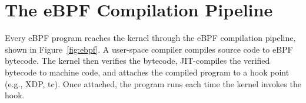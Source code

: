 






\section{The eBPF Compilation Pipeline}
\label{sec:background}

Every eBPF program reaches the kernel through the eBPF compilation pipeline, shown in Figure~\ref{fig:ebpf}. A user-space compiler compiles source code to eBPF bytecode. The kernel then verifies the bytecode, JIT-compiles the verified bytecode to machine code, and attaches the compiled program to a hook point (e.g., XDP, tc). Once attached, the program runs each time the kernel invokes the hook.



